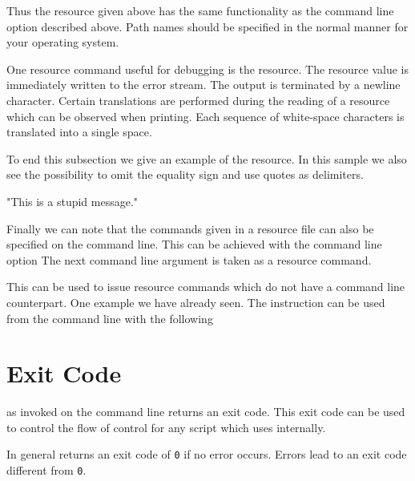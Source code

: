 \documentclass[11pt,a4paper]{scrbook}
\begin{document}
Thus the resource given above has the same functionality as the command line
option  described above. Path names should be specified in the normal
manner for your operating system.

One resource command useful for debugging is the  resource. The
resource value is immediately written to the error stream. The output is
terminated by a newline character. Certain translations are performed during
the reading of a resource which can be observed when printing. Each sequence
of white-space characters is translated into a single space.

To end this subsection we give an example of the  resource. In this
sample we also see the possibility to omit the equality sign and use quotes as
delimiters.

\begin{Resources}
   "This is a stupid message."
\end{Resources}

Finally we can note that the commands given in a resource file can also be
specified on the command line. This can be achieved with the command line
option \opt{-} The next command line argument is taken as a resource command.


This can be used to issue resource commands which do not have a command line
counterpart. One example we have already seen. The  instruction can
be used from the command line with the following


\section{Exit Code}

\BibTool{} as invoked on the command line returns an exit code. This exit code
can be used to control the flow of control for any script which uses
\BibTool{} internally.

In general \BibTool{} returns an exit code of \verb|0| if no error occurs.
Errors lead to an exit code different from \verb|0|.

\medskip

\begin{Summary}
\end{Summary}
\end{document}

